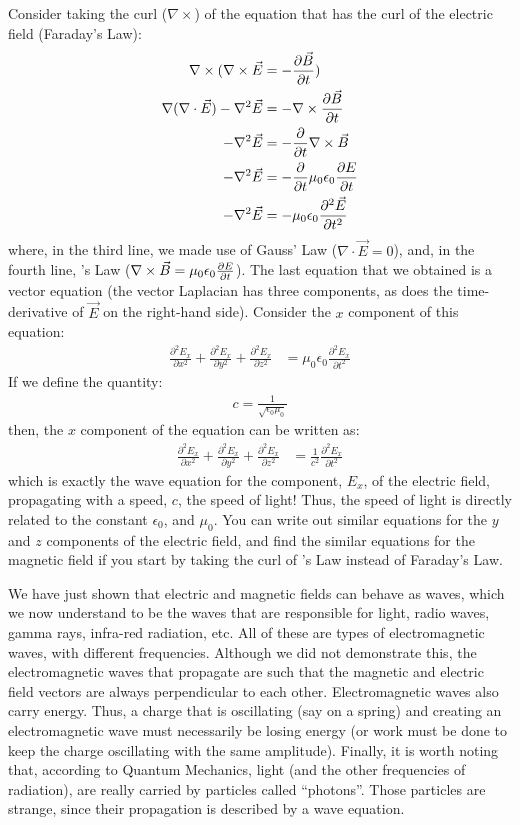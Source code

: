 Consider taking the curl ($\nabla \times$) of the equation that has the curl of the electric field (Faraday's Law):
\begin{align*}
\nabla \times (\nabla \times \vec E &= -\frac{\partial \vec B}{\partial t})\\
\nabla(\nabla\cdot \vec E)-\nabla^2\vec E &= -\nabla \times \frac{\partial \vec B}{\partial t}\\
-\nabla^2\vec E &= - \frac{\partial }{\partial t} \nabla \times \vec B\\
-\nabla^2\vec E &= - \frac{\partial }{\partial t} \mu_0 \epsilon_0\frac{\partial E}{\partial t}\\
-\nabla^2\vec E &= - \mu_0 \epsilon_0\frac{\partial^2\vec E}{\partial t^2} 
\end{align*}
where, in the third line, we made use of Gauss' Law ($\nabla \cdot \vec E=0$), and, in the fourth line, \ampere's Law ($\nabla \times \vec B = \mu_0 \epsilon_0\frac{\partial E}{\partial t}$). The last equation that we obtained is a vector equation (the vector Laplacian has three components, as does the time-derivative of $\vec E$ on the right-hand side). Consider the $x$ component of this equation:
\begin{align*}
\frac{\partial^2 E_x}{\partial x^2}+\frac{\partial^2  E_x}{\partial y^2} + \frac{\partial^2 E_x}{\partial z^2}  &= \mu_0 \epsilon_0\frac{\partial^2 E_x}{\partial t^2} 
\end{align*}
If we define the quantity:
\begin{align*}
c = \frac{1}{\sqrt{\epsilon_0\mu_0}}
\end{align*}
then, the $x$ component of the equation can be written as:
\begin{align*}
\frac{\partial^2 E_x}{\partial x^2}+\frac{\partial^2  E_x}{\partial y^2} + \frac{\partial^2 E_x}{\partial z^2} &= \frac{1}{c^2}\frac{\partial^2 E_x}{\partial t^2} 
\end{align*}
which is exactly the wave equation for the component, $E_x$, of the electric field, propagating with a speed, $c$, the speed of light! Thus, the speed of light is directly related to the constant $\epsilon_0$, and $\mu_0$. You can write out similar equations for the $y$ and $z$ components of the electric field, and find the similar equations for the magnetic field if you start by taking the curl of \ampere's Law instead of Faraday's Law. 

We have just shown that electric and magnetic fields can behave as waves, which we now understand to be the waves that are responsible for light, radio waves, gamma rays, infra-red radiation, etc. All of these are types of electromagnetic waves, with different frequencies. Although we did not demonstrate this, the electromagnetic waves that propagate are such that the magnetic and electric field vectors are always perpendicular to each other. Electromagnetic waves also carry energy. Thus, a charge that is oscillating (say on a spring) and creating an electromagnetic wave must necessarily be losing energy (or work must be done to keep the charge oscillating with the same amplitude). Finally, it is worth noting that, according to Quantum Mechanics, light (and the other frequencies of radiation), are really carried by particles called ``photons''. Those particles are strange, since their propagation is described by a wave equation. 

